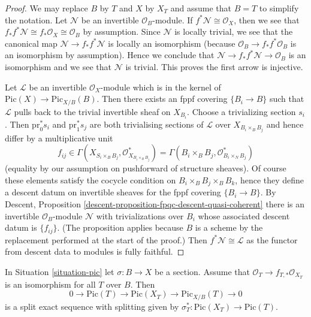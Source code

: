 \begin{proof}
We may replace $B$ by $T$ and $X$ by $X_T$ and assume that $B = T$
to simplify the notation. Let $\mathcal{N}$ be an invertible
$\mathcal{O}_B$-module. If $f^*\mathcal{N} \cong \mathcal{O}_X$, then
we see that $f_*f^*\mathcal{N} \cong f_*\mathcal{O}_X \cong \mathcal{O}_B$
by assumption. Since $\mathcal{N}$ is locally trivial, we see that
the canonical map $\mathcal{N} \to f_*f^*\mathcal{N}$ is locally
an isomorphism (because $\mathcal{O}_B \to f_*f^*\mathcal{O}_B$
is an isomorphism by assumption). Hence we conclude that
$\mathcal{N} \to f_*f^*\mathcal{N} \to \mathcal{O}_B$ is an isomorphism
and we see that $\mathcal{N}$ is trivial. This proves the first arrow
is injective.

\medskip\noindent
Let $\mathcal{L}$ be an invertible $\mathcal{O}_X$-module which is in
the kernel of $\text{Pic}(X) \to \text{Pic}_{X/B}(B)$. Then there exists
an fppf covering $\{B_i \to B\}$ such that $\mathcal{L}$ pulls back
to the trivial invertible sheaf on $X_{B_i}$. Choose a trivializing
section $s_i$. Then $\text{pr}_0^*s_i$ and $\text{pr}_1^*s_j$ are both
trivialising sections of $\mathcal{L}$ over $X_{B_i \times_B B_j}$
and hence differ by a multiplicative unit
$$
f_{ij} \in
\Gamma(X_{S_i \times_B B_j}, \mathcal{O}_{X_{B_i \times_B B_j}}^*) =
\Gamma(B_i \times_B B_j, \mathcal{O}_{B_i \times_N B_j}^*)
$$
(equality by our assumption on pushforward of structure sheaves).
Of course these elements satisfy the cocycle condition on
$B_i \times_B B_j \times_B B_k$, hence they define a descent datum
on invertible sheaves for the fppf covering $\{B_i \to B\}$.
By Descent, Proposition \ref{descent-proposition-fpqc-descent-quasi-coherent}
there is an invertible $\mathcal{O}_B$-module $\mathcal{N}$
with trivializations over $B_i$ whose associated descent datum is
$\{f_{ij}\}$. (The proposition applies because $B$ is a scheme
by the replacement performed at the start of the proof.)
Then $f^*\mathcal{N} \cong \mathcal{L}$ as the
functor from descent data to modules is fully faithful.
\end{proof}

\begin{lemma}
\label{lemma-flat-geometrically-connected-fibres-with-section}
In Situation \ref{situation-pic} let $\sigma : B \to X$ be a section.
Assume that $\mathcal{O}_T \to f_{T, *}\mathcal{O}_{X_T}$ is an isomorphism
for all $T$ over $B$. Then
$$
0 \to \text{Pic}(T) \to \text{Pic}(X_T) \to \text{Pic}_{X/B}(T) \to 0
$$
is a split exact sequence with splitting given by
$\sigma_T^* : \text{Pic}(X_T) \to \text{Pic}(T)$.
\end{lemma}

